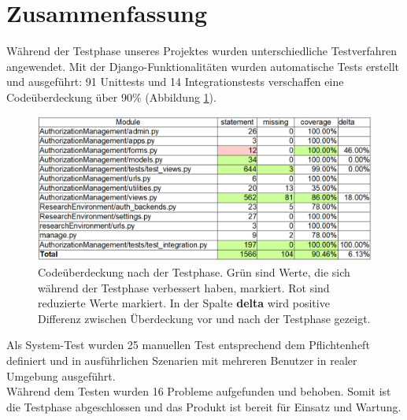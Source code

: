\documentclass[parskip=full,11pt]{scrartcl}
\begin{document}
\begin{itemize}
\end{itemize}   

\newpage
\section{Zusammenfassung} \label{zusammenfassung}
Während der Testphase unseres Projektes wurden unterschiedliche Testverfahren angewendet. Mit der Django-Funktionalitäten wurden automatische Tests erstellt und ausgeführt: 91 Unittests und 14 Integrationstests verschaffen eine Codeüberdeckung über 90\% (Abbildung \ref{coverage}). \\

 \begin{figure}[ht!]
 	\centering
 	\includegraphics[width=1\textwidth]{res/coverage_after.png}
 	\caption{Codeüberdeckung nach der Testphase. Grün sind Werte, die sich während der Testphase verbessert haben, markiert. Rot sind reduzierte Werte markiert. In der Spalte \textbf{delta} wird positive Differenz zwischen Überdeckung vor und nach der Testphase gezeigt.}
\label{coverage}
 \end{figure}
 Als System-Test wurden 25 manuellen Test entsprechend dem Pflichtenheft definiert und in ausführlichen Szenarien mit mehreren Benutzer in realer Umgebung ausgeführt.\\
Während dem Testen wurden 16 Probleme aufgefunden und behoben. Somit ist die Testphase abgeschlossen und das Produkt ist bereit für Einsatz und Wartung. 
\end{document}
